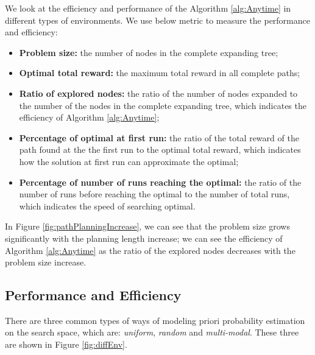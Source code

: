 \documentclass[12pt]{article}
\begin{document}
We look at the efficiency and performance of the Algorithm \ref{alg:Anytime} in different types of environments. 
We use below metric to measure the performance and efficiency:
\begin{itemize}
\item \textbf{Problem size: } the number of nodes in the complete expanding tree;
\item \textbf{Optimal total reward: } the maximum total reward in all complete paths;
\item \textbf{Ratio of explored nodes: } the ratio of the number of nodes expanded to the number of the nodes in the complete expanding tree, which indicates the efficiency of Algorithm \ref{alg:Anytime};
\item \textbf{Percentage of optimal at first run: } the ratio of the total reward of the path found at the the first run to the optimal total reward, which indicates how the solution at first run can approximate the optimal;
\item \textbf{Percentage of number of runs reaching the optimal: } the ratio of the number of runs before reaching the optimal to the number of total runs, which indicates the speed of searching optimal.
\end{itemize}

In Figure \ref{fig:pathPlanningIncrease}, we can see that the problem size grows significantly with the planning length increase;
we can see the efficiency of Algorithm \ref{alg:Anytime} as the ratio of the explored nodes decreases with the problem size increase. 

\subsection{Performance and Efficiency}
\label{subsec:performance_and_efficiency}

There are three common types of ways of modeling priori probability estimation on the search space, which are: \emph{uniform}, \emph{random} and \emph{multi-modal}. 
These three are shown in Figure \ref{fig:diffEnv}.  
\end{document}
